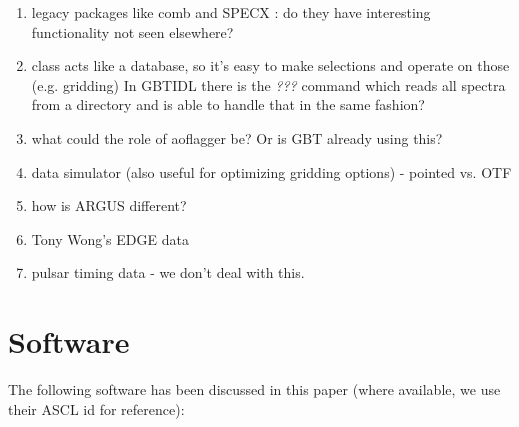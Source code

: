 \documentclass[12pt,a4paper]{article}
\begin{document}
\begin{enumerate}

\item legacy packages like comb and SPECX : do they have interesting functionality not seen elsewhere?

\item class acts like a database, so it's easy to make selections and operate on those (e.g. gridding)
  In GBTIDL there is the {\it ???} command which reads all spectra from a directory and is able
  to handle that in the same fashion?

\item   what could the role of aoflagger \cite{offringa-2012-morph-rfi-algorithm} be? Or is GBT already
  using this?

\item  data simulator (also useful for optimizing gridding options) - pointed vs. OTF

\item how is ARGUS different?

\item Tony Wong's EDGE data  

\item pulsar timing data - we don't deal with this.
  
\end{enumerate}

\section{Software}

The following software has been discussed in this paper (where available, we use their ASCL id for reference):
\end{document}
